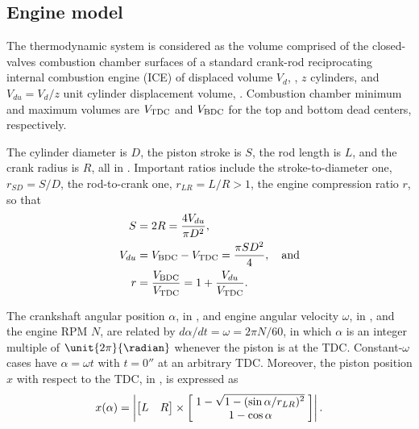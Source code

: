     \subsection{Engine model}\label{sec:model.engine}

    The thermodynamic system is considered as the volume comprised of the closed-valves combustion chamber surfaces of a standard crank-rod reciprocating internal combustion  engine  (ICE)  of
    displaced volume $V_d$, \meter\cubed, $z$ cylinders, and $V_{du} = V_d / z$ unit cylinder displacement volume, \meter\cubed. Combustion chamber minimum and maximum volumes are $V_{\mbox{\scriptsize TDC}}$ and
    $V_{\mbox{\scriptsize BDC}}$ for the top and bottom dead centers, respectively.

    The cylinder diameter is $D$, the piston stroke is $S$, the rod length is $L$, and the crank radius is $R$, all in \meter. Important ratios include the stroke-to-diameter  one,  $r_{SD}  =
    S/D$, the rod-to-crank one, $r_{LR} = L/R > 1$, the engine compression ratio $r$, so that%
    \begin{align}
        \label{eq:S}
        S       &= 2 R = \frac{4 V_{du}}{\pi D^{2}}, \\
        \label{eq:Vdu}
        V_{du}  &= V_{\mbox{\scriptsize BDC}} - V_{\mbox{\scriptsize TDC}} = \frac{\pi SD^2}{4}, \quad\mbox{and} \\
        \label{eq:r}
        r       &= \frac{V_{\mbox{\scriptsize BDC}}}{V_{\mbox{\scriptsize TDC}}} = 1 + \frac{V_{du}}{V_{\mbox{\scriptsize TDC}}}.
    \end{align}

    The crankshaft angular position $\alpha$, in \radian, and engine angular velocity $\omega$, in \radian\per\second, and the engine RPM $N$, are related by $d\alpha/dt = \omega = 2\pi N/60$,
    in which $\alpha$ is an integer multiple of $\unit{2\pi}{\radian}$ whenever the piston is at the TDC. Constant-$\omega$ cases have $\alpha = \omega t$ with $t =  \unit{0}{\second}$  at  an
    arbitrary TDC. Moreover, the piston position $x$ with respect to the TDC, in \meter, is expressed as%
    \begin{equation}
        \label{eq:x}
        x(\alpha) = \left|
                \left[\begin{matrix}L & R\end{matrix}\right] \times
                \left[\;\begin{matrix}
                    1 - \sqrt{\smash[b]{1 - (\sin\alpha / r_{LR})^2}} \\
                    1 - \cos\alpha
                \end{matrix}\;\right]
            \right|.
    \end{equation}%

